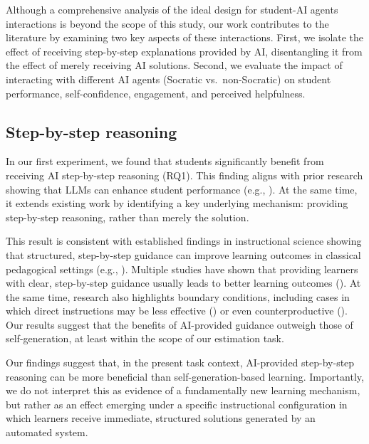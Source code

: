 \documentclass[
  12pt,
]{article}
\begin{document}
Although a comprehensive analysis of the ideal design for student-AI agents interactions is beyond the scope of this study, our work contributes to the literature by examining two key aspects of these interactions. First, we isolate the effect of receiving step-by-step explanations provided by AI, disentangling it from the effect of merely receiving AI solutions. Second, we evaluate the impact of interacting with different AI agents (Socratic vs.~non-Socratic) on student performance, self-confidence, engagement, and perceived helpfulness.

\subsection{Step-by-step reasoning}\label{step-by-step-reasoning}

In our first experiment, we found that students significantly benefit from receiving AI step-by-step reasoning (RQ1). This finding aligns with prior research showing that LLMs can enhance student performance (e.g., ). At the same time, it extends existing work by identifying a key underlying mechanism: providing step-by-step reasoning, rather than merely the solution.

This result is consistent with established findings in instructional science showing that structured, step-by-step guidance can improve learning outcomes in classical pedagogical settings (e.g., ). Multiple studies have shown that providing learners with clear, step-by-step guidance usually leads to better learning outcomes (). At the same time, research also highlights boundary conditions, including cases in which direct instructions may be less effective () or even counterproductive (). Our results suggest that the benefits of AI-provided guidance outweigh those of self-generation, at least within the scope of our estimation task.

Our findings suggest that, in the present task context, AI-provided step-by-step reasoning can be more beneficial than self-generation-based learning. Importantly, we do not interpret this as evidence of a fundamentally new learning mechanism, but rather as an effect emerging under a specific instructional configuration in which learners receive immediate, structured solutions generated by an automated system.
\end{document}

